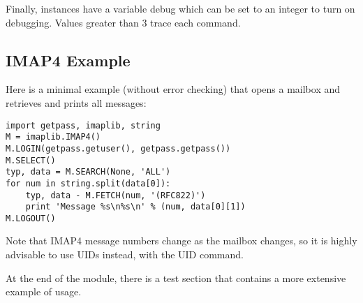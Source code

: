 Finally,  instances have a variable debug which can be
set to an integer to turn on debugging.  Values greater than 3 trace
each command.


\subsection{IMAP4 Example}

Here is a minimal example (without error checking) that opens a
mailbox and retrieves and prints all messages:

\begin{verbatim}
import getpass, imaplib, string
M = imaplib.IMAP4()
M.LOGIN(getpass.getuser(), getpass.getpass())
M.SELECT()
typ, data = M.SEARCH(None, 'ALL')
for num in string.split(data[0]):
    typ, data - M.FETCH(num, '(RFC822)')
    print 'Message %s\n%s\n' % (num, data[0][1])
M.LOGOUT()
\end{verbatim}

Note that IMAP4 message numbers change as the mailbox changes, so it
is highly advisable to use UIDs instead, with the UID command.

At the end of the module, there is a test section that contains a more
extensive example of usage.

\begin{seealso}
\end{seealso}
